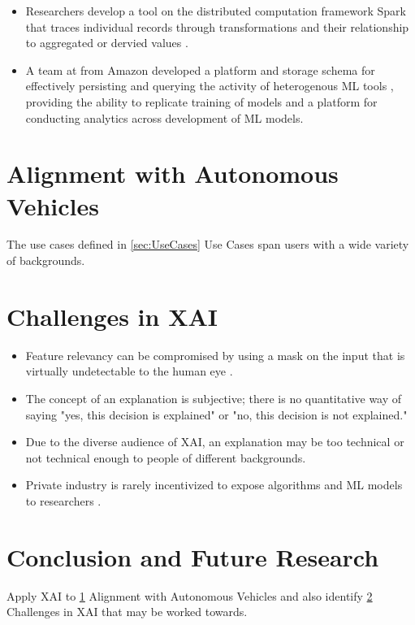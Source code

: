 \documentclass{IEEEtran}
\begin{document}
\begin{itemize}
    \item Researchers develop a tool on the distributed computation framework Spark that traces individual records through transformations and their relationship to aggregated or dervied values  \cite{Interlandi2017}.
    \item A team at from Amazon developed a platform and storage schema for effectively persisting and querying the activity of heterogenous ML tools \cite{Schelter2017}, providing the ability to replicate training of models and a platform for conducting analytics across development of ML models.
\end{itemize}

\section{Alignment with Autonomous Vehicles}\label{sec:Alignment}

The use cases defined in \ref{sec:UseCases} Use Cases span users with a wide variety of backgrounds.

\section{Challenges in XAI} \label{sec:Challenges}

\begin{itemize}
    \item Feature relevancy can be compromised by using a mask on the input that is virtually undetectable to the human eye \cite{DBLP:journals/corr/abs-1812-00891}.

    \item The concept of an explanation is subjective; there is no quantitative way of saying "yes, this decision is explained" or "no, this decision is not explained." \cite{Bibal2016}

    \item Due to the diverse audience of XAI, an explanation may be too technical or not technical enough to people of different backgrounds.
    
    \item Private industry is rarely incentivized to expose algorithms and ML models to researchers \cite{Veale:2018:FAD:3173574.3174014}.
\end{itemize}

\section{Conclusion and Future Research}

Apply XAI to \ref{sec:Alignment} Alignment with Autonomous Vehicles and also identify \ref{sec:Challenges} Challenges in XAI that may be worked towards.


 
\end{document}
